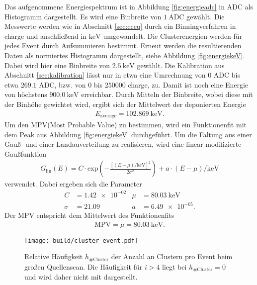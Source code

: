 Das aufgenommene Energiespektrum ist in Abbildung \ref{fig:energieadc} in ADC als
Histogramm dargestellt. Es wird eine Binbreite von $\SI{1}{\text{ADC}}$ gewählt.
Die Messwerte werden wie in Abschnitt \ref{sec:cceq} durch ein Binningverfahren in charge und anschließend
in $\si{\kilo\electronvolt}$ umgewandelt. Die Clusterenergien werden für jedes Event durch Aufsummieren
bestimmt. Erneut werden die resultierenden Daten als normiertes Histogramm dargestellt, siehe Abbildung \ref{fig:energiekeV}. Dabei wird hier eine Binbreite
von $\SI{2.5}{\kilo\electronvolt}$ gewählt. Die Kalibration aus Abschnitt \ref{sec:kalibration} lässt nur in etwa
eine Umrechnung von $0$ ADC bis etwa $269.1$ ADC, bzw. von $0$ bis $250000$ charge, zu. Damit ist noch eine Energie von höchstens
$\SI{900.0}{\kilo\electronvolt}$ erreichbar. Durch Mitteln der Binbreite, wobei diese mit der Binhöhe gewichtet wird,
ergibt sich der Mittelwert der deponierten Energie
\begin{align}
  E_\text{average} = \SI{102.869}{\kilo\electronvolt}.
\end{align}
Um den MPV(Most Probable Value) zu bestimmen, wird ein Funktionenfit mit dem Peak aus Abbildung \ref{fig:energiekeV} durchgeführt.
Um die Faltung aus einer Gauß- und einer Landauverteilung zu realisieren, wird eine linear modifizierte Gaußfunktion
\begin{align}
  G_\text{lin}(E) = C \cdot \text{exp}\left(-\frac{\left[(E-\mu)/\si{\kilo\electronvolt}\right]^2}{2\sigma^2} \right) + a \cdot (E-\mu)/\si{\kilo\electronvolt}
\end{align}
verwendet. Dabei ergeben sich die Parameter
\begin{align}
  C &= \num{1.42e-02} & \mu &= \SI{80.03}{\kilo\electronvolt} \\
  \sigma &= \num{21.09} & a &= \num{6.49e-05}.
\end{align}
Der MPV entspricht dem Mittelwert des Funktionenfits
\begin{align}
  \text{MPV} = \mu = \SI{80.03}{\kilo\electronvolt}.
\end{align}

\begin{figure}
  \centering
  \texttt{[image: build/cluster\_event.pdf]}
  \caption{Relative Häufigkeit $h_{\#\text{Cluster}}$ der Anzahl an Clustern pro Event beim großen Quellenscan. Die Häufigkeit für $i>4$ liegt bei $h_{\#\text{Cluster}}=0$ und wird daher nicht mit dargestellt.}
  \label{fig:clusterevent}
\end{figure}


